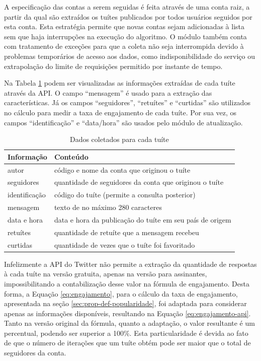 \documentclass[oneside,openright,12pt]{ufsm_2015} %
\begin{document}
    \par A especificação das contas a serem seguidas é feita através de uma conta raiz, a partir da qual são extraídos os tuítes publicados por todos usuários seguidos por esta conta. Esta estratégia permite que novas contas sejam adicionadas à lista sem que haja interrupções na execução do algoritmo. O módulo também conta com tratamento de exceções para que a coleta não seja interrompida devido à problemas temporários de acesso aos dados, como indisponibilidade do serviço ou extrapolação do limite de requisições permitido por instante de tempo.
    
    \par Na Tabela \ref{tab:dados-coleta} podem ser visualizadas as informações extraídas de cada tuíte através da API. O campo ``mensagem'' é usado para a extração das características. Já os campos ``seguidores'', ``retuítes'' e ``curtidas'' são utilizados no cálculo para medir a taxa de engajamento de cada tuíte. Por sua vez, os campos ``identificação'' e ``data/hora'' são usados pelo módulo de atualização.
    
    \begin{table}[ht]
    \centering
    \caption{Dados coletados para cada tuíte}
    \label{tab:dados-coleta}
    \begin{tabular}{|l|l|}
    \hline
    \textbf{Informação} & \textbf{Conteúdo} \\ \hline
    autor &  código e nome da conta que originou o tuíte \\ \hline
    seguidores &  quantidade de seguidores da conta que originou o tuíte \\ \hline
    identificação & código do tuíte (permite a consulta posterior) \\ \hline
    mensagem & texto de no máximo 280 caracteres \\ \hline
    data e hora & data e hora da publicação do tuíte em seu país de origem \\ \hline
    retuítes & quantidade de retuíte que a mensagem recebeu \\ \hline
    curtidas & quantidade de vezes que o tuíte foi favoritado \\ \hline
    \end{tabular}
    \end{table}
    
    \par Infelizmente a API do Twitter não permite a extração da quantidade de respostas à cada tuíte na versão gratuita, apenas na versão para assinantes, impossibilitando a contabilização desse valor na fórmula de engajamento. Desta forma, a Equação \ref{eq:engajamento}, para o cálculo da taxa de engajamento, apresentada na seção \ref{sec:prop-def-popularidade}, foi adaptada para considerar apenas as informações disponíveis, resultando na Equação \ref{eq:engajamento-api}. Tanto na versão original da fórmula, quanto a adaptação, o valor resultante é um percentual, podendo ser superior a 100\%. Esta particularidade é devida ao fato de que o número de iterações que um tuíte obtém pode ser maior que o total de seguidores da conta.
    
\end{document}
